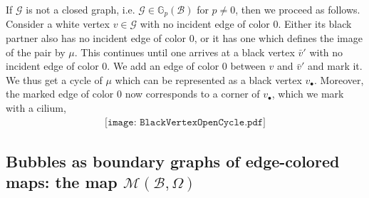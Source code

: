 \documentclass[aps,prd,10pt,notitlepage,nofootinbib,superscriptaddress,showkeys,showpacs]{revtex4-1}
\begin{document}
If ${\mathcal{G}}$ is not a closed graph, i.e. ${\mathcal{G}}\in{\mathbb{G}}_p({\mathcal{B}})$ for $p\neq 0$, then we proceed as follows. Consider a white vertex $v\in{\mathcal{G}}$ with no incident edge of color 0. Either its black partner also has no incident edge of color 0, or it has one which defines the image of the pair by $\mu$. This continues until one arrives at a black vertex $\bar{v}'$ with no incident edge of color 0. We add an edge of color 0 between $v$ and $\bar{v}'$ and mark it. We thus get a cycle of $\mu$ which can be represented as a black vertex $v_\bullet$. Moreover, the marked edge of color 0 now corresponds to a corner of $v_\bullet$, which we mark with a cilium,
\begin{equation}
\begin{array}{c}\texttt{[image: BlackVertexOpenCycle.pdf]}\end{array}
\end{equation}

\subsection{Bubbles as boundary graphs of edge-colored maps: the map ${\mathcal{M}}({\mathcal{B}}, \Omega)$} \label{sec:BoundaryGraphs}
\end{document}
